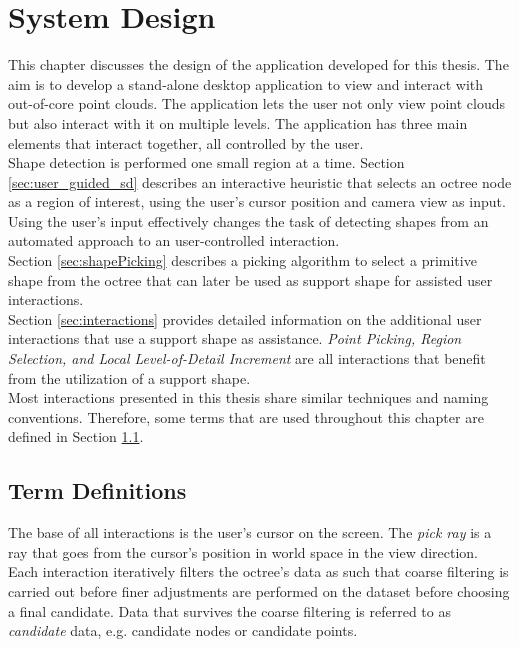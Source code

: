 \chapter{System Design}
\label{chap:systemDesign}

This chapter discusses the design of the application developed for this thesis. The aim is to develop a stand-alone desktop application to view and interact with out-of-core point clouds. The application lets the user not only view point clouds but also interact with it on multiple levels. The application has three main elements that interact together, all controlled by the user. 
\\
Shape detection is performed one small region at a time. Section \ref{sec:user_guided_sd} describes an interactive heuristic that selects an octree node as a region of interest, using the user's cursor position and camera view as input. Using the user's input effectively changes the task of detecting shapes from an automated approach to an user-controlled interaction.
\\
Section \ref{sec:shapePicking} describes a picking algorithm to select a primitive shape from the octree that can later be used as support shape for assisted user interactions. 
\\
Section \ref{sec:interactions} provides detailed information on the additional user interactions that use a support shape as assistance. \textit{Point Picking, Region Selection, and Local Level-of-Detail Increment} are all interactions that benefit from the utilization of a support shape. 
\\
Most interactions presented in this thesis share similar techniques and naming conventions. Therefore, some terms that are used throughout this chapter are defined in Section \ref{sec:termDefinitions}. 


\section{Term Definitions}
\label{sec:termDefinitions}

The base of all interactions is the user's cursor on the screen. The \textit{pick ray} is a ray that goes from the cursor’s position in world space in the view direction. 
Each interaction iteratively filters the octree's data as such that coarse filtering is carried out before finer adjustments are performed on the dataset before choosing a final candidate. Data that survives the coarse filtering is referred to as \textit{candidate} data, e.g. candidate nodes or candidate points. 


